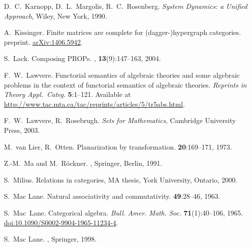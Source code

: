 \begin{thebibliography}{RSW00}
    D.\ C.\ Karnopp, D.\ L.\ Margolis, R.\ C.\ Rosenberg.
    \newblock \textsl{System Dynamics: a Unified Approach}, Wiley, New York, 1990.

    A.\ Kissinger.
    \newblock Finite matrices are complete for (dagger-)hypergraph categories.
    \newblock preprint.
    \newblock \href{http://arxiv.org/abs/1406.5942}{arXiv:1406.5942}.

    S.\ Lack.
    \newblock Composing PROPs.
    , {\bf 13}(9):147--163,
    2004.

    F.\ W.\ Lawvere.
    \newblock Functorial semantics of algebraic theories and
    some algebraic problems in the context of functorial semantics of algebraic
    theories.
    \newblock \textsl{Reprints in Theory Appl.\ Categ.} {\bf 5}:1--121.
    \newblock 
    Available at
    \href{http://www.tac.mta.ca/tac/reprints/articles/5/tr5abs.html}
    {http://www.tac.mta.ca/tac/reprints/articles/5/tr5abs.html}.

    F.\ W.\ Lawvere, R.\ Rosebrugh.
    \newblock \emph{Sets for Mathematics},
    Cambridge University Press, 2003.

    M.\ van Lier, R.\ Otten.
    \newblock Planarization by transformation.
     {\bf 20}:169--171, 1973.

    Z.-M.\ Ma and M.\ R\"ockner.
    , Springer, Berlin, 1991.

    S.\ Milius.
    \newblock Relations in categories, MA thesis, York University,
    Ontario, 2000.

    S.\ Mac Lane.
    \newblock Natural associativity and commutativity.
     {\bf 49}:28--46, 1963. 

    S.\ Mac\ Lane.
    \newblock Categorical algebra.
    \newblock \emph{Bull. Amer. Math. Soc.} {\bf 71}(1):40--106, 1965.
    \newblock 
    \href{http://doi.org/10.1090/S0002-9904-1965-11234-4}{doi:10.1090/S0002-9904-1965-11234-4}.

    S.\ Mac Lane.
    ,
    Springer, 1998.


\end{thebibliography}
